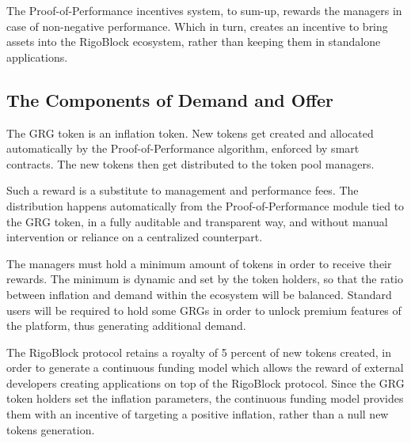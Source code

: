\documentclass[9pt,oneside]{amsart}
\begin{document}
\begin{multicols}{2}
The Proof-of-Performance incentives system, to sum-up, rewards the managers in case of non-negative performance. Which in turn, creates an incentive to bring assets into the RigoBlock ecosystem, rather than keeping them in standalone applications.

\subsection{The Components of Demand and Offer}
The GRG token is an inflation token. New tokens get created and allocated automatically by the Proof-of-Performance algorithm, enforced by smart contracts. The new tokens then get distributed to the token pool managers. 

Such a reward is a substitute to management and performance fees. The distribution happens automatically from the Proof-of-Performance module tied to the GRG token, in a fully auditable and transparent way, and without manual intervention or reliance on a centralized counterpart. 

The managers must hold a minimum amount of tokens in order to receive their rewards. The minimum is dynamic and set by the token holders, so that the ratio between inflation and demand within the ecosystem will be balanced. Standard users will be required to hold some GRGs in order to unlock premium features of the platform, thus generating additional demand. 

The RigoBlock protocol retains a royalty of 5 percent of new tokens created, in order to generate a continuous funding model which allows the reward of external developers creating applications on top of the RigoBlock protocol. Since the GRG token holders set the inflation parameters, the continuous funding model provides them with an incentive of targeting a positive inflation, rather than a null new tokens generation.


\end{multicols}
\end{document}
